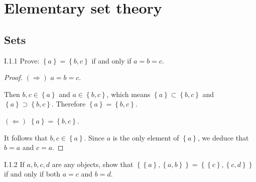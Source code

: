\chapter{Elementary set theory}

\section{Sets}

\begin{problem}{I.1.1}
Prove: \( \left\{ a \right\} = \left\{ b, c \right\} \) if and only if \( a = b = c \).
\end{problem}

\begin{proof}
	\( (\Longrightarrow) \) \( a = b = c \).

	Then \( b, c \in \left\{ a \right\} \) and \( a \in \left\{ b, c \right\} \), which means \( \left\{ a \right\} \subset \left\{ b, c \right\} \) and \( \left\{ a \right\} \supset \left\{ b, c \right\} \). Therefore \( \left\{ a \right\} = \left\{ b, c \right\} \).

	\( (\Longleftarrow) \) \( \left\{ a \right\} = \left\{ b, c \right\} \).

	It follows that \( b, c \in \left\{ a \right\} \). Since \( a \) is the only element of \( \left\{ a \right\} \), we deduce that \( b = a \) and \( c = a \).
\end{proof}

\begin{problem}{I.1.2}
If \( a, b, c, d \) are any objects, show that \( \left\{ \left\{ a \right\}, \left\{ a, b \right\} \right\} = \left\{ \left\{ c \right\}, \left\{ c, d \right\} \right\} \) if and only if both \( a = c \) and \( b = d \).
\end{problem}

